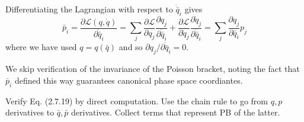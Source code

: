 \documentclass[../principles-of-quantum-mechanics.tex]{subfiles}
\begin{document}
\begin{questions}
\begin{solution}
			Differentiating the Lagrangian with respect to $\dot{\bar{q}}_i$ gives
			\[
				\bar{p}_i = \frac{\partial \mathcal{L}(q, \dot{q})}{\partial \dot{\bar{q}}_i} = \sum_j\frac{\partial\mathcal{L}}{\partial q_j}\frac{\partial q_j}{\partial \dot{\bar{q}}_i} + \frac{\partial \mathcal{L}}{\partial \dot{q}_j}\frac{\partial \dot{q}_j}{\partial \dot{\bar{q}}_i} = \sum_j\frac{\partial q_j}{\partial \bar{q}_i}p_j
			\]
			where we have used $q = q(\bar{q})$ and so $\partial q_j / \partial \dot{\bar{q}}_i = 0$.
			
			We skip verification of the invariance of the Poisson bracket, noting the fact that $\bar{p}_i$ defined this way guarantees canonical phase space coordiantes.
		\end{solution}
		
		\question Verify Eq. (2.7.19) by direct computation. Use the chain rule to go from $q, p$ derivatives to $\bar{q}, \bar{p}$ derivatives. Collect terms that represent PB of the latter.
		

\end{questions}
\end{document}
